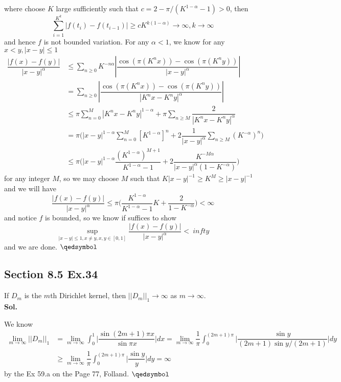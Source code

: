 \documentclass[lang=en,11pt,a4paper,citestyle =authoryear]{elegantpaper}
\newcommand{\prvd}{$\hfill \qedsymbol$}
\begin{document}
where choose $K$ large sufficiently such that $c = 2-\pi/(K^{1-\alpha}-1)>0$, then
\[
\sum\limits_{i=1}^{K^k}|f(t_i)-f(t_{i-1})| \geq cK^{k(1-\alpha)} \to \infty, k\to\infty
\]
and hence $f$ is not bounded variation. For any $\alpha<1$, we know for any $x<y, |x-y|\leq 1$
\[
\begin{aligned}
\dfrac{|f(x)-f(y)|}{|x-y|^{\alpha}} &\leq \sum\limits_{n\geq 0}K^{-n\alpha}|\dfrac{\cos(\pi(K^nx))-\cos(\pi(K^ny))}{|x-y|^{\alpha}}| \\ &= \sum\limits_{n\geq 0}|\dfrac{\cos(\pi(K^nx))-\cos(\pi(K^ny))}{|K^n x-K^n y|^{\alpha}}| \\
& \leq \pi\sum\limits_{n = 0}^M|K^{n}x-K^n y|^{1-\alpha} + \pi \sum\limits_{n\geq M} \dfrac{2}{|K^nx-K^ny|^{\alpha}} \\
&= \pi\Big(|x-y|^{1-\alpha}\sum\limits_{n = 0}^M [K^{1-\alpha}]^n + 2\dfrac{1}{|x-y|^{\alpha}} \sum\limits_{n\geq M}(K^{-\alpha})^n\Big) \\
&\leq \pi\Big(|x-y|^{1-\alpha}\dfrac{(K^{1-\alpha})^{M+1}}{K^{1-\alpha}-1} + 2\dfrac{K^{-M\alpha}}{|x-y|^{\alpha}(1-K^{-\alpha})} \Big)
\end{aligned}
\]
for any integer $M$, so we may choose $M$ such that $ K|x-y|^{-1} \geq K^{M} \geq |x-y|^{-1}$ and we will have
\[
\dfrac{|f(x)-f(y)|}{|x-y|^{\alpha}} \leq \pi\Big(\dfrac{K^{1-\alpha}}{K^{1-\alpha}-1}K + \dfrac{2}{1-K^{-\alpha}}\Big) < \infty
\]
and notice $f$ is bounded, so we know if suffices to show
\[
\sup_{|x-y|\leq 1, x\neq y, x,y\in[0,1]}\dfrac{|f(x)-f(y)|}{|x-y|^{\alpha}} <\ infty\]
and we are done.
\prvd

\subsection*{Section 8.5 Ex.34} 
If $D_m$ is the $m$th Dirichlet kernel, then $||D_m||_1 \to \infty$ as $m\to\infty$.
\vspace{0.5em}\\
\textbf{Sol.} \par
We know
\[
\begin{aligned}
\lim_{m\to\infty}||D_m||_1 &= \lim_{m\to\infty}\int_0^1 \Big|\dfrac{\sin (2m+1)\pi x}{\sin\pi x}\Big| dx = \lim_{m\to\infty}\dfrac{1}{\pi}\int_0^{(2m+1)\pi} \Big|\dfrac{\sin y}{(2m+1)\sin y/(2m+1)}\Big| dy \\ &\geq \lim_{m\to\infty}\dfrac{1}{\pi}\int_0^{(2m+1)\pi} \Big|\dfrac{\sin y}{y}\Big| dy = \infty
\end{aligned}
\]
by the Ex 59.a on the Page 77, Folland.
\prvd
\vspace{0.5em}
\end{document}
